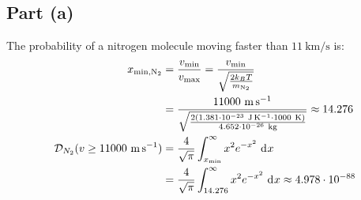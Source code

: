 \documentclass{article}
\begin{document}
\clearpage

\subsection*{Part (a)}
The probability of a nitrogen molecule moving faster than $11~\unit{\kilo\meter\per\second}$ is:
\begin{equation}
    \begin{split}
        x_{\text{min},\ce{N2}} & = \frac{v_{\text{min}}}{v_{\text{max}}} = \frac{v_{\text{min}}}{\sqrt{\frac{2k_BT}{m_{\ce{N2}}}}} \\
        & = \frac{11000~\unit{\meter\per\second}}{\sqrt{\frac{2\left(1.381 \cdot 10^{-23}~\unit{\joule\per\kelvin} \cdot 1000~\unit{\kelvin}\right)}{4.652 \cdot 10^{-26}~\unit{\kilo\gram}}}} \approx 14.276 \\
        \mathcal{D}_{N_2}(v \geq 11000~\unit{\meter\per\second}) & = \frac{4}{\sqrt{\pi}}\int_{x_{\text{min}}}^{\infty} x^2 e^{-x^2} \, \diff{x} \\
        & = \frac{4}{\sqrt{\pi}}\int_{14.276}^{\infty} x^2 e^{-x^2} \, \diff{x} \approx 4.978 \cdot 10^{-88} \\
    \end{split}
\end{equation}
\end{document}
